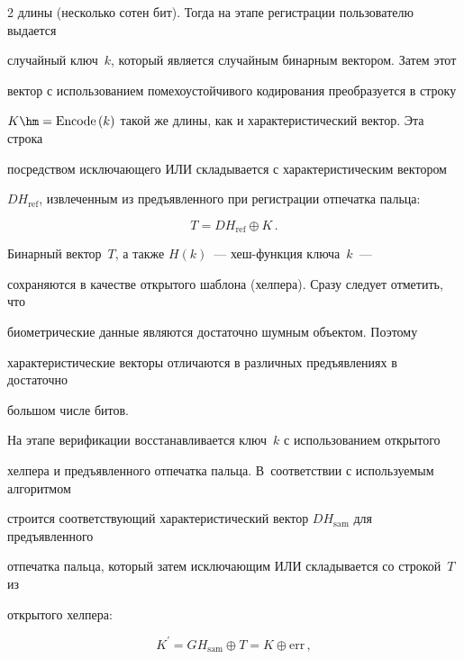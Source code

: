 \begin{multicols}{2}
длины (несколько сотен бит). Тогда на этапе регистрации пользователю выдается 

случайный ключ~$k$, который является случайным бинарным вектором. Затем этот 

вектор с использованием помехоустойчивого кодирования преобразуется в строку 

$K\hm=\mathrm{Encode}\left(k\right)$ такой же длины, как и характеристический вектор. Эта строка 

посредством исключающего ИЛИ складывается с характеристическим вектором 

$DH_{\mathrm{ref}}$, извлеченным из предъявленного при регистрации отпечатка \mbox{пальца}:

      \begin{equation*}

      T=DH_{\mathrm{ref}}\oplus K\,.


      \end{equation*}

      

      Бинарный вектор~$T$, а также $H(k)$~--- хеш-функ\-ция ключа~$k$~--- 

сохраняются в качестве открытого шаблона (хелпера). Сразу следует отметить, что 

биометрические данные являются достаточно шумным объектом. Поэтому 

характеристические векторы отличаются в различных предъявлениях в достаточно 

большом числе битов.

      

      На этапе верификации восстанавливается ключ~$k$ с использованием открытого 

хелпера и предъявленного отпечатка пальца. В~соответствии с используемым алгоритмом 

строится со\-от\-вет\-ст\-ву\-ющий характеристический вектор $DH_{\mathrm{sam}}$ для предъявленного 

отпечатка пальца, который затем исключающим ИЛИ складывается со строкой~$T$ из 

открытого хелпера:

      \begin{equation}

      K^\prime= GH_{\mathrm{sam}}\oplus T=K\oplus \mathrm{err}\,,

      \label{e2-usm}

      \end{equation}


\end{multicols}

